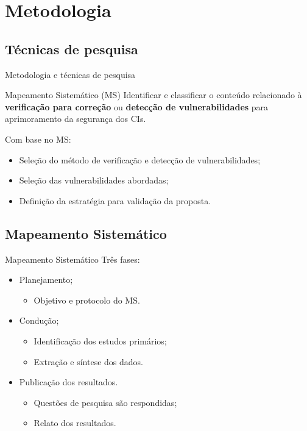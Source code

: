 \section{Metodologia}
\subsection{Técnicas de pesquisa}

\begin{frame}{Metodologia e técnicas de pesquisa}
    \begin{block}{Mapeamento Sistemático (MS)}
    Identificar e classificar o conteúdo relacionado à \textbf{verificação para correção} ou \textbf{detecção de vulnerabilidades} para aprimoramento da segurança dos CIs.
    \end{block}
    Com base no MS:
    \begin{itemize}
        \item Seleção do método de verificação e detecção de vulnerabilidades;
        \item Seleção das vulnerabilidades abordadas;
        \item Definição da estratégia para validação da proposta. 
    \end{itemize}
\end{frame}

\subsection{Mapeamento Sistemático}
\begin{frame}{Mapeamento Sistemático}
    Três fases:
    \begin{itemize}
        \item Planejamento;
        \begin{itemize}
            \item Objetivo e protocolo do MS.
        \end{itemize}
        \item Condução;
        \begin{itemize}
            \item Identificação dos estudos primários;
            \item Extração e síntese dos dados.
        \end{itemize}
        \item Publicação dos resultados.
        \begin{itemize}
            \item Questões de pesquisa são respondidas;
            \item Relato dos resultados.
        \end{itemize}
    \end{itemize}
\end{frame}

